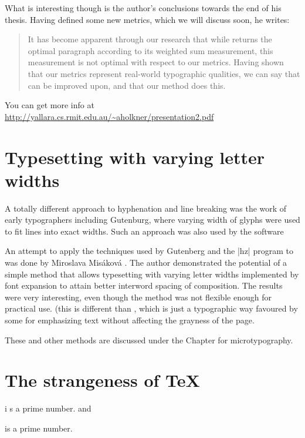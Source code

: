 {{\begin{quote}
\end{quote}

What is interesting though is the author's conclusions towards the end of his thesis. Having defined some new metrics, which we will discuss soon, he writes:

\begin{quote}
It has become apparent through our research that while \tex returns the optimal paragraph according
to its weighted sum measurement, this measurement is not optimal with respect to our metrics.
Having shown that our metrics represent real-world typographic qualities, we can say that \tex can be
improved upon, and that our method does this.

\end{quote}

You can get more info at \url{http://yallara.cs.rmit.edu.au/~aholkner/presentation2.pdf}


\section{Typesetting with varying letter widths}
A totally different approach to hyphenation and line breaking was the work of early typographers including
Gutenburg, where varying width of glyphs were used to fit lines into exact widths. Such an approach was
also used by the  software\cite{hz}

An attempt to apply the techniques used by Gutenberg and the |hz| program to 
was done by Miroslava Mis\'akov\'a \cite{Miroslava1998}. The author demonstrated the potential of a simple
method that allows typesetting with varying letter widths implemented by font expansion
to attain better interword spacing of composition. The results were very interesting,
even though the method was not flexible enough for practical use. (this is different than , which
is just a typographic way favoured by some for emphasizing text without affecting the grayness of the page.

These and other methods are discussed under the Chapter for microtypography. 
\section{The strangeness of TeX}

{
 i s a prime number.
and

 is  a prime number.
}




}}

